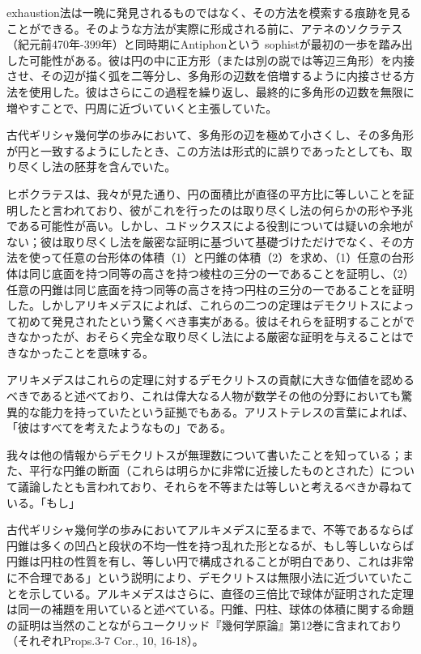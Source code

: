 \documentclass[a4paper,11pt,openany]{ltjsbook}
\begin{document}
exhaustion法は一晩に発見されるものではなく、その方法を模索する痕跡を見ることができる。そのような方法が実際に形成される前に、アテネのソクラテス（紀元前470年-399年）と同時期にAntiphonという sophistが最初の一歩を踏み出した可能性がある。彼は円の中に正方形（または別の説では等辺三角形）を内接させ、その辺が描く弧を二等分し、多角形の辺数を倍増するように内接させる方法を使用した。彼はさらにこの過程を繰り返し、最終的に多角形の辺数を無限に増やすことで、円周に近づいていくと主張していた。

古代ギリシャ幾何学の歩みにおいて、多角形の辺を極めて小さくし、その多角形が円と一致するようにしたとき、この方法は形式的に誤りであったとしても、取り尽くし法の胚芽を含んでいた。

ヒポクラテスは、我々が見た通り、円の面積比が直径の平方比に等しいことを証明したと言われており、彼がこれを行ったのは取り尽くし法の何らかの形や予兆である可能性が高い。しかし、ユドックススによる役割については疑いの余地がない；彼は取り尽くし法を厳密な証明に基づいて基礎づけただけでなく、その方法を使って任意の台形体の体積（1）と円錐の体積（2）を求め、（1）任意の台形体は同じ底面を持つ同等の高さを持つ棱柱の三分の一であることを証明し、（2）任意の円錐は同じ底面を持つ同等の高さを持つ円柱の三分の一であることを証明した。しかしアリキメデスによれば、これらの二つの定理はデモクリトスによって初めて発見されたという驚くべき事実がある。彼はそれらを証明することができなかったが、おそらく完全な取り尽くし法による厳密な証明を与えることはできなかったことを意味する。

アリキメデスはこれらの定理に対するデモクリトスの貢献に大きな価値を認めるべきであると述べており、これは偉大なる人物が数学その他の分野においても驚異的な能力を持っていたという証拠でもある。アリストテレスの言葉によれば、「彼はすべてを考えたようなもの」である。

我々は他の情報からデモクリトスが無理数について書いたことを知っている；また、平行な円錐の断面（これらは明らかに非常に近接したものとされた）について議論したとも言われており、それらを不等または等しいと考えるべきか尋ねている。「もし」

古代ギリシャ幾何学の歩みにおいてアルキメデスに至るまで、不等であるならば円錐は多くの凹凸と段状の不均一性を持つ乱れた形となるが、もし等しいならば円錐は円柱の性質を有し、等しい円で構成されることが明白であり、これは非常に不合理である」という説明により、デモクリトスは無限小法に近づいていたことを示している。アルキメデスはさらに、直径の三倍比で球体が証明された定理は同一の補題を用いていると述べている。円錐、円柱、球体の体積に関する命題の証明は当然のことながらユークリッド『幾何学原論』第12巻に含まれており（それぞれProps.3-7 Cor., 10, 16-18）。
\end{document}
